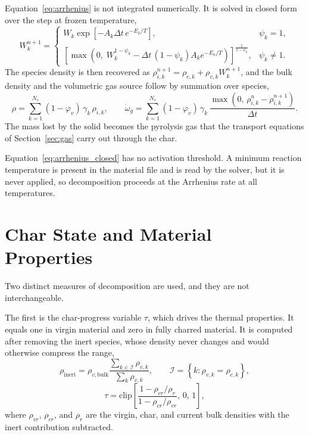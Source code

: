 \documentclass[11pt]{report}
\begin{document}
Equation~\eqref{eq:arrhenius} is not integrated numerically. It is solved in
closed form over the step at frozen temperature,
\begin{equation}
W^{n+1}_k =
\begin{cases}
W_k \exp\!\left[-A_k \Delta t\, e^{-E_k/T}\right], & \psi_k = 1, \\[8pt]
\left[\max\!\left(0,\; W_k^{1-\psi_k} - \Delta t\,(1-\psi_k) A_k e^{-E_k/T}\right)\right]^{\frac{1}{1-\psi_k}},
& \psi_k \neq 1 .
\end{cases}
\label{eq:arrhenius_closed}
\end{equation}
The species density is then recovered as
$\rho^{n+1}_{i,k} = \rho_{c,k} + \rho_{v,k} W^{n+1}_k$, and the bulk density and
the volumetric gas source follow by summation over species,
\begin{equation}
\rho = \sum_{k=1}^{N_s} (1-\varphi_v)\,\gamma_k\, \rho_{i,k},
\qquad
\dot\omega_g = \sum_{k=1}^{N_s} (1-\varphi_v)\,\gamma_k\,
\frac{\max\!\left(0,\, \rho^{n}_{i,k} - \rho^{n+1}_{i,k}\right)}{\Delta t}.
\label{eq:gas_source}
\end{equation}
The mass lost by the solid becomes the pyrolysis gas that the transport equations
of Section~\ref{sec:gas} carry out through the char.

Equation~\eqref{eq:arrhenius_closed} has no activation threshold. A minimum
reaction temperature is present in the material file and is read by the solver,
but it is never applied, so decomposition proceeds at the Arrhenius rate at all
temperatures.

\section{Char State and Material Properties}
\label{sec:tau}

Two distinct measures of decomposition are used, and they are not
interchangeable.

The first is the char-progress variable $\tau$, which drives the thermal
properties. It equals one in virgin material and zero in fully charred material.
It is computed after removing the inert species, whose density never changes and
would otherwise compress the range,
\begin{equation}
\rho_{\mathrm{inert}} = \rho_{v,\mathrm{bulk}}
\frac{\sum_{k \in \mathcal{I}} \rho_{v,k}}{\sum_{k} \rho_{v,k}},
\qquad
\mathcal{I} = \left\{k : \rho_{v,k} = \rho_{c,k}\right\},
\end{equation}
\begin{equation}
\tau = \mathrm{clip}\!\left[
\frac{1 - \rho_{cr}/\rho_r}{1 - \rho_{cr}/\rho_{vr}},\, 0,\, 1\right],
\label{eq:tau}
\end{equation}
where $\rho_{vr}$, $\rho_{cr}$, and $\rho_r$ are the virgin, char, and current
bulk densities with the inert contribution subtracted.
\end{document}

